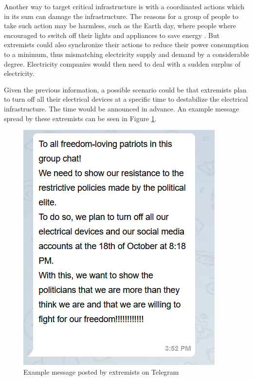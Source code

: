 Another way to target critical infrastructure is with a coordinated
actions which in its sum can damage the infrastructure. The 
reasons for a group of people to take such action may be harmless,
such as the Earth day, where people where encouraged to switch off their 
lights and appliances to save energy \cite{earthday}.
But extremists could also synchronize their actions to reduce their
power consumption to a minimum, thus mismatching electricity supply
and demand by a considerable degree. Electricity companies would 
then need to deal with a sudden surplus of electricity.

Given the previous information, a possible scenario could be 
that extremists plan to turn off all their electrical devices at 
a specific time to destabilize the electrical infrastructure. The
time would be announced in advance. An example message spread by
these extremists can be seen in Figure \ref{schwurbler}.

\begin{figure}[!ht]
    \center
    \includegraphics[scale=.7]{figs/schwurblerchat.png}
    \caption{Example message posted by extremists on Telegram}
    \label{schwurbler}
\end{figure}


